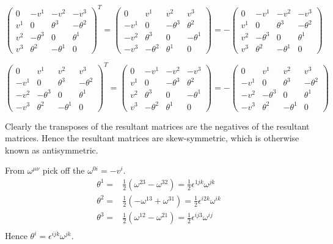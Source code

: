 \documentclass{article}
\begin{document}
\[\begin{pmatrix}0&-v^1&-v^2&-v^3\\v^1&0&\theta^3&-\theta^2\\v^2&-\theta^3&0&\theta^1\\v^3&\theta^2&-\theta^1&0\end{pmatrix}^T=\begin{pmatrix}0&v^1&v^2&v^3\\-v^1&0&-\theta^3&\theta^2\\-v^2&\theta^3&0&-\theta^1\\-v^3&-\theta^2&\theta^1&0\end{pmatrix}=-\begin{pmatrix}0&-v^1&-v^2&-v^3\\v^1&0&\theta^3&-\theta^2\\v^2&-\theta^3&0&\theta^1\\v^3&\theta^2&-\theta^1&0\end{pmatrix}\]

\[\begin{pmatrix}0&v^1&v^2&v^3\\-v^1&0&\theta^3&-\theta^2\\-v^2&-\theta^3&0&\theta^1\\-v^3&\theta^2&-\theta^1&0\end{pmatrix}^T=\begin{pmatrix}0&-v^1&-v^2&-v^3\\v^1&0&-\theta^3&\theta^2\\v^2&\theta^3&0&-\theta^1\\v^3&-\theta^2&\theta^1&0\end{pmatrix}=-\begin{pmatrix}0&v^1&v^2&v^3\\-v^1&0&\theta^3&-\theta^2\\-v^2&-\theta^3&0&\theta^1\\-v^3&\theta^2&-\theta^1&0\end{pmatrix}\]

Clearly the transposes of the resultant matrices are the negatives of the resultant matrices. Hence the resultant matrices are skew-symmetric, which is otherwise known as antisymmetric.

From $\omega^{\mu\nu}$ pick off the $\omega^{0i}=-v^i$.
\begin{align*}
	\theta^1=&\frac{1}{2}(\omega^{23}-\omega^{32})=\frac{1}{2}\epsilon^{1jk}\omega^{jk}\\
	\theta^2=&\frac{1}{2}(-\omega^{13}+\omega^{31})=\frac{1}{2}\epsilon^{i2k}\omega^{ik}\\
	\theta^3=&\frac{1}{2}(\omega^{12}-\omega^{21})=\frac{1}{2}\epsilon^{ij3}\omega^{ij}\\
\end{align*}
Hence $\theta^i=\epsilon^{ijk}\omega^{jk}$.
 
\end{document}
